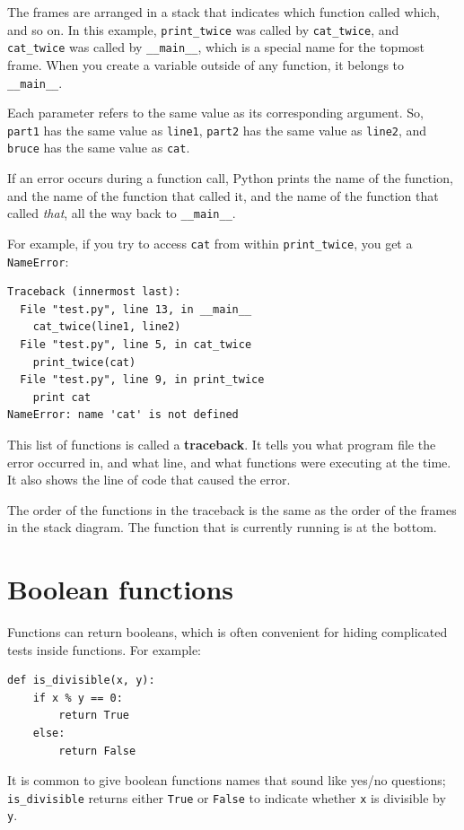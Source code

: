 The frames are arranged in a stack that indicates which function
called which, and so on.  In this example, \verb"print_twice"
was called by \verb"cat_twice", and \verb"cat_twice" was called by 
\verb"__main__", which is a special name for the topmost frame.  When
you create a variable outside of any function, it belongs to 
\verb"__main__".

Each parameter refers to the same value as its corresponding
argument.  So, {\tt part1} has the same value as
{\tt line1}, {\tt part2} has the same value as {\tt line2},
and {\tt bruce} has the same value as {\tt cat}.

If an error occurs during a function call, Python prints the
name of the function, and the name of the function that called
it, and the name of the function that called {\em that}, all the
way back to \verb"__main__".

For example, if you try to access {\tt cat} from within 
\verb"print_twice", you get a {\tt NameError}:

\beforeverb
\begin{verbatim}
Traceback (innermost last):
  File "test.py", line 13, in __main__
    cat_twice(line1, line2)
  File "test.py", line 5, in cat_twice
    print_twice(cat)
  File "test.py", line 9, in print_twice
    print cat
NameError: name 'cat' is not defined
\end{verbatim}
\afterverb
%
This list of functions is called a {\bf traceback}.  It tells you what
program file the error occurred in, and what line, and what functions
were executing at the time.  It also shows the line of code that
caused the error.


The order of the functions in the traceback is the same as the
order of the frames in the stack diagram.  The function that is
currently running is at the bottom.


\section{Boolean functions}
\label{boolean}


Functions can return booleans, which is often convenient for hiding
complicated tests inside functions.  For example:

\beforeverb
\begin{verbatim}
def is_divisible(x, y):
    if x % y == 0:
        return True
    else:
        return False
\end{verbatim}
\afterverb
%
It is common to give boolean functions names that sound like yes/no
questions; \verb"is_divisible" returns either {\tt True} or {\tt False}
to indicate whether {\tt x} is divisible by {\tt y}.

